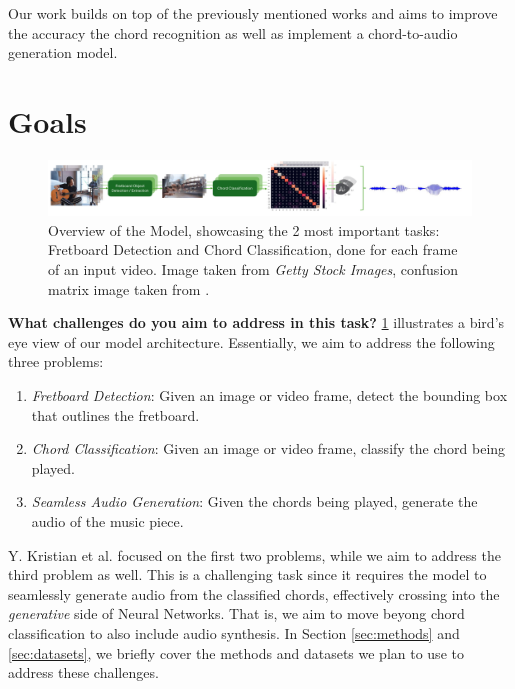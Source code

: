 \documentclass[10pt,twocolumn,letterpaper]{article}
\begin{document}
Our work builds on top of the previously mentioned works \cite{Kristian_Zaman_Tenoyo_Jodhinata_2024}
\cite{du2023conditional} and aims to improve the accuracy the chord recognition as well as implement a chord-to-audio generation model.

\section{Goals}

\begin{figure}[h]
    \centering
    \includegraphics[width=\textwidth]{images/task-diagram.pdf}
    \caption{Overview of the Model, showcasing the 2 most important tasks: 
    Fretboard Detection and Chord Classification, done for each frame of an input video. Image taken from \textit{Getty Stock Images}, confusion matrix image taken from \cite{Kristian_Zaman_Tenoyo_Jodhinata_2024}.}
    \label{fig:model-diagram}
\end{figure}

\textbf{What challenges do you aim to address in this task?}
\cref{fig:model-diagram} illustrates a bird's eye view of our model architecture. Essentially, we aim to address the following three problems: 
\begin{enumerate}[label=\arabic*)]
    \item \emph{Fretboard Detection}: Given an image or video frame, detect the bounding box that outlines the fretboard.
    \item \emph{Chord Classification}: Given an image or video frame, classify the chord being played.
    \item \emph{Seamless Audio Generation}: Given the chords being played, generate the audio of the music piece.
\end{enumerate}
Y. Kristian et al. \cite{Kristian_Zaman_Tenoyo_Jodhinata_2024} focused on the first two problems, while we aim to address the third problem as well. This is a challenging task since it requires the model to seamlessly generate audio from the classified chords, effectively crossing into the \emph{generative} side of Neural Networks. That is, we aim to move beyong chord classification to also include audio synthesis. In Section \cref{sec:methods} and \cref{sec:datasets}, we briefly cover the methods and datasets we plan to use to address these challenges.
\end{document}
